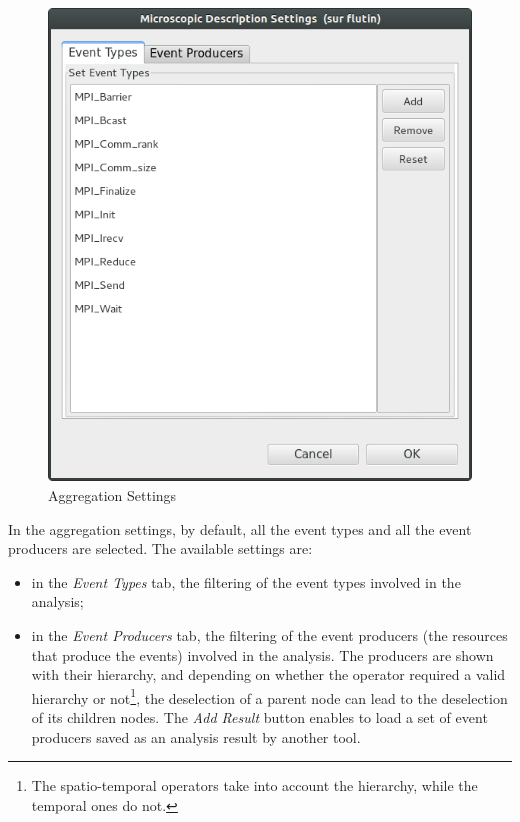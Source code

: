 \documentclass[twoside]{article}
\begin{document}
\begin{sloppypar}
\begin{figure}[h!]
	\centering
	\includegraphics[scale=0.4]{images/state_settings.png}
	\caption{Aggregation Settings}
	\label{microSettings}
\end{figure}

In the aggregation settings, by default, all the event types and all the event producers are selected. The available settings are:
\begin{itemize}
	\item in the \textit{Event Types} tab, the filtering of the event types involved in the analysis;
	\item in the \textit{Event Producers} tab, the filtering of the event producers (the resources that produce the events) involved in the analysis. The producers are shown with their hierarchy, and depending on whether the operator required a valid hierarchy or not\footnote{The spatio-temporal operators take into account the hierarchy, while the temporal ones do not.}, the deselection of a parent node can lead to the deselection of its children nodes. The \textit{Add Result} button enables to load a set of event producers saved as an analysis result by another tool.
\end{itemize}


\end{sloppypar}
\end{document}
